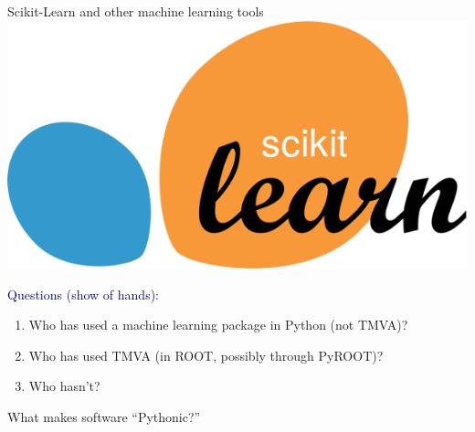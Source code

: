\documentclass[aspectratio=169]{beamer}
\begin{document}
\begin{frame}{Scikit-Learn and other machine learning tools}
\vspace{0.25 cm}
\hfill \includegraphics[height=1.1 cm]{sklearn-logo.png}

\vspace{-1.1 cm}

\vfill
\small
\textcolor{darkblue}{Questions (show of hands):}
\vspace{-0.2 cm}
\begin{enumerate}\setlength{\itemsep}{-0.1 cm}
\item Who has used a machine learning package in Python (not TMVA)?
\item Who has used TMVA (in ROOT, possibly through PyROOT)?
\item Who hasn't?
\end{enumerate}
\end{frame}

\begin{frame}{What makes software ``Pythonic?''}
\end{frame}
\end{document}
